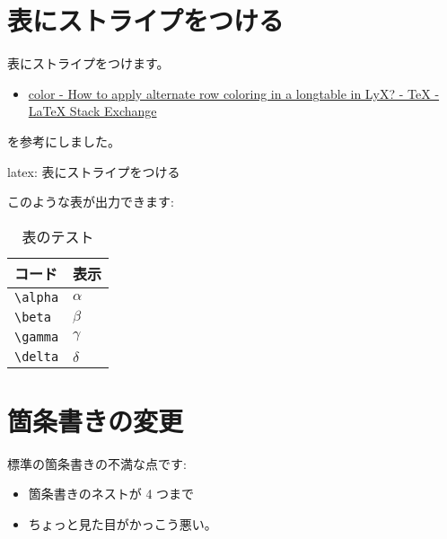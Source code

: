 \documentclass[dvipdfmx,a4j,14pt,uplatex,openany]{jsbook}
\begin{document}
\section{表にストライプをつける}
\label{sec:org94ffcfa}
表にストライプをつけます。

\begin{itemize}
\item \href{https://tex.stackexchange.com/questions/61747/how-to-apply-alternate-row-coloring-in-a-longtable-in-lyx}{color - How to apply alternate row coloring in a longtable in LyX? - \TeX{} - \LaTeX{} Stack Exchange}
\end{itemize}

を参考にしました。


\begin{programlist}[label={org460ddb4}]{latex}{: 表にストライプをつける}%

\let\oldtabular\tabular
\let\endoldtabular\endtabular
\renewenvironment{tabular}{\rowcolors{2}{white}{lightgray}\oldtabular}{\endoldtabular}
\end{programlist}

このような表が出力できます:

\begin{table}[htbp]
\caption{表のテスト}
\centering
\begin{tabular}{ll}
コード & 表示\\
\hline
\texttt{\textbackslash{}alpha} & \(\alpha\)\\
\texttt{\textbackslash{}beta} & \(\beta\)\\
\texttt{\textbackslash{}gamma} & \(\gamma\)\\
\texttt{\textbackslash{}delta} & \(\delta\)\\
\hline
\end{tabular}
\end{table}

\section{箇条書きの変更}
\label{sec:org18a445e}
標準の箇条書きの不満な点です:

\begin{itemize}
\item 箇条書きのネストが 4 つまで
\item ちょっと見た目がかっこう悪い。
\end{itemize}
\end{document}
